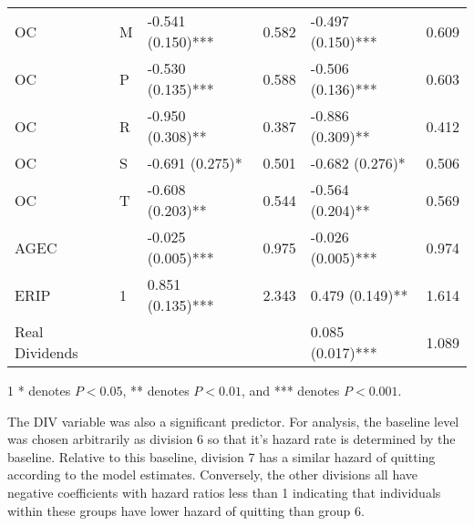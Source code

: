 \documentclass[12pt,letterpaper]{article}
\begin{document}
\begin{table}[htbp]
\begin{threeparttable}
\begin{tabular}{llL{2.5cm}L{1.5cm}L{2.5cm}L{1.5cm}}
			OC  & M     & -0.541 (0.150)*** & 0.582 & -0.497 (0.150)*** & 0.609 \\
			OC  & P     & -0.530 (0.135)*** & 0.588 & -0.506 (0.136)*** & 0.603 \\
			OC  & R     & -0.950 (0.308)** & 0.387 & -0.886 (0.309)** & 0.412 \\
			OC  & S     & -0.691 (0.275)* & 0.501 & -0.682 (0.276)* & 0.506 \\
			OC  & T     & -0.608 (0.203)** & 0.544 & -0.564 (0.204)** & 0.569 \\
			AGEC &       & -0.025 (0.005)*** & 0.975 & -0.026 (0.005)*** & 0.974 \\
			ERIP  & 1     & 0.851 (0.135)*** & 2.343 & 0.479 (0.149)** & 1.614 \\
			Real Dividends &       &       &       & 0.085 (0.017)*** & 1.089 \\
			\bottomrule
		\end{tabular}%
		\begin{tablenotes}
			\item[1] * denotes $P<0.05$, ** denotes $P<0.01$, and *** denotes $P<0.001$.
		\end{tablenotes}
		
	\end{threeparttable}
	\label{tab:vqparaest}%
\end{table}
The DIV variable was also a significant predictor.  For analysis, the baseline level was chosen arbitrarily as division 6 so that it's hazard rate is determined by the baseline.  Relative to this baseline, division 7 has a similar hazard of quitting according to the model estimates. Conversely, the other divisions all have negative coefficients with hazard ratios less than 1 indicating that individuals within these groups have lower hazard of quitting than group 6.
\end{document}
